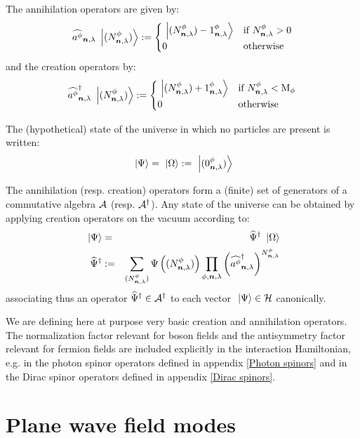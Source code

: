 \documentclass[10pt,a4paper,twoside,openany]{book}
\begin{document}
 The annihilation operators are given by:
\begin{equation*}
\widehat{a^{\phi}}_{{\boldsymbol{n}}, {\lambda}} \ \left|{({N}^{\phi}_{{\boldsymbol{n}}, {\lambda}})}\right\rangle := \begin{cases}
\ \left|{({N}^{\phi}_{{\boldsymbol{n}}, {\lambda}}) - {1}^{\phi}_{{\boldsymbol{n}}, {\lambda}}}\right\rangle & \text{if ${N}^{\phi}_{{\boldsymbol{n}}, {\lambda}} > 0$} \\
0 & \text{otherwise}
\end{cases}
\end{equation*}
and the creation operators by:
\begin{equation*}
\widehat{a^{\phi}}^{\dagger}_{{\boldsymbol{n}}, {\lambda}} \ \left|{({N}^{\phi}_{{\boldsymbol{n}}, {\lambda}})}\right\rangle := \begin{cases}
\ \left|{({N}^{\phi}_{{\boldsymbol{n}}, {\lambda}}) + {1}^{\phi}_{{\boldsymbol{n}}, {\lambda}}}\right\rangle & \text{if ${N}^{\phi}_{{\boldsymbol{n}}, {\lambda}} < \mathrm M_{\phi}$} \\
0 & \text{otherwise}
\end{cases}
\end{equation*}

The (hypothetical) state of the universe in which no particles are present is written:
\begin{equation*}
\ \left|{\Psi}\right\rangle = \ \left|{\Omega}\right\rangle := \ \left|{({0}^{\phi}_{{\boldsymbol{n}}, {\lambda}})}\right\rangle
\end{equation*}

 The annihilation (resp. creation) operators form a (finite) set of generators of a commutative algebra $\mathcal A$ (resp. $\mathcal A^{\dagger}$). Any state of the universe can be obtained by applying creation operators on the vacuum according to:
\begin{eqnarray*}
\ \left|{\Psi}\right\rangle & = & \widehat{\Psi}^{\dagger} \ \left|{\Omega}\right\rangle \\
\widehat{\Psi}^{\dagger} & := & \sum_{({N}^{\phi}_{{\boldsymbol{n}}, {\lambda}})} \Psi \left(({N}^{\phi}_{{\boldsymbol{n}}, {\lambda}}) \right) \prod_{\phi,\boldsymbol{n},\lambda} \left( \widehat{a^{\phi}}^{\dagger}_{{\boldsymbol{n}}, {\lambda}} \right)^{{N}^{\phi}_{{\boldsymbol{n}}, {\lambda}}}
\end{eqnarray*}
associating thus an operator $\widehat{\Psi}^{\dagger} \in \mathcal A^{\dagger}$ to each vector $\ \left|{\Psi}\right\rangle \in \mathcal H$ canonically.

 We are defining here at purpose very basic creation and annihilation operators. The normalization factor relevant for boson fields and the antisymmetry factor relevant for fermion fields are included explicitly in the interaction Hamiltonian, e.g. in the photon spinor operators defined in appendix \ref{Photon spinors} and in the Dirac spinor operators defined in appendix \ref{Dirac spinors}.

\section{Plane wave field modes}
\end{document}
